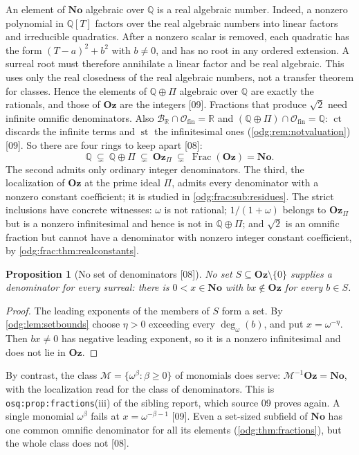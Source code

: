 \documentclass[11pt,oneside]{article}
\numberwithin{equation}{section}
\newtheorem{proposition}[proposition]{Proposition}
\theoremstyle{definition}
\theoremstyle{remark}
\newcommand{\No}{\mathbf{No}}
\newcommand{\Oz}{\mathbf{Oz}}
\newcommand{\Q}{\mathbb Q}
\newcommand{\R}{\mathbb R}
\newcommand{\BR}{\mathcal B_{\R}}
\newcommand{\ct}{\operatorname{ct}}
\newcommand{\ddeg}{\operatorname{deg}_{\omega}}
\newcommand{\Frac}{\operatorname{Frac}}
\newcommand{\src}[1]{\textup{\textsf{\small[#1]}}}
\newcommand{\replabel}[1]{\nolinkurl{#1}}
\newcommand{\st}{\operatorname{st}}
\newcommand{\Ofin}{\mathcal O_{\mathrm{fin}}}
\begin{document}
An element of $\No$ algebraic over $\Q$ is a real algebraic number.
Indeed, a nonzero polynomial in $\Q[T]$ factors over the real algebraic
numbers into linear factors and irreducible quadratics. After a nonzero
scalar is removed, each quadratic has the form $(T-a)^2+b^2$ with $b\ne0$,
and has no root in any ordered extension. A surreal root must therefore
annihilate a linear factor and be real algebraic. This uses only the real
closedness of the real algebraic numbers, not a transfer theorem for classes.
Hence the elements of $\Q\oplus\Pi$ algebraic over $\Q$ are exactly the
rationals, and those of $\Oz$ are the integers \src{09}. Fractions that
produce $\sqrt2$ need infinite omnific denominators. Also
$\BR\cap\Ofin=\R$ and $(\Q\oplus\Pi)\cap\Ofin=\Q$: $\ct$ discards the infinite
terms and $\st$ the infinitesimal ones (\cref{odg:rem:notvaluation}) \src{09}.
So there are four rings to keep apart \src{08}:
\[
 \Q\ \subsetneq\ \Q\oplus\Pi\ \subsetneq\ \Oz_\Pi\ \subsetneq\ \Frac(\Oz)=\No .
\]
The second admits only ordinary integer denominators. The third, the
localization of $\Oz$ at the prime ideal $\Pi$, admits every denominator with a
nonzero constant coefficient; it is studied in \cref{odg:frac:sub:residues}.
The strict inclusions have concrete witnesses: $\omega$ is not rational;
$1/(1+\omega)$ belongs to $\Oz_\Pi$ but is a nonzero infinitesimal and hence
is not in $\Q\oplus\Pi$; and $\sqrt2$ is an omnific fraction but cannot
have a denominator with nonzero integer constant coefficient, by
\cref{odg:frac:thm:realconstants}.

\begin{proposition}[No set of denominators \src{08}]\label{odg:frac:prop:nosetdenominators}
No set $S\subseteq\Oz\setminus\{0\}$ supplies a denominator for every surreal:
there is $0<x\in\No$ with $bx\notin\Oz$ for every $b\in S$.
\end{proposition}
\begin{proof}
The leading exponents of the members of $S$ form a set. By
\cref{odg:lem:setbounds} choose $\eta>0$ exceeding every $\ddeg(b)$, and put
$x=\omega^{-\eta}$. Then $bx\ne0$ has negative leading exponent, so it is a
nonzero infinitesimal and does not lie in $\Oz$.
\end{proof}

By contrast, the class $\mathcal M=\{\omega^\beta:\beta\ge0\}$ of monomials does
serve: $\mathcal M^{-1}\Oz=\No$, with the localization read for the class of
denominators. This is \replabel{osq:prop:fractions}(iii) of the sibling
report, which source 09 proves again. A single monomial $\omega^\beta$ fails
at $x=\omega^{-\beta-1}$ \src{09}. Even a set-sized subfield of $\No$ has one
common omnific denominator for all its elements (\cref{odg:thm:fractions}),
but the whole class does not \src{08}.
\end{document}
